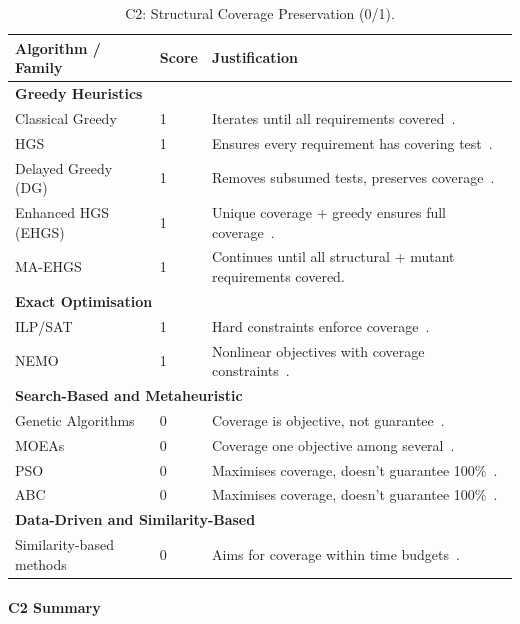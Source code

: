 \begin{appendices}
\begin{table}[H]
  \centering
  \footnotesize
  \caption{C2: Structural Coverage Preservation (0/1).}
  \label{tab:app-c2}
  \begin{tabular}{@{}p{4.5cm}p{0.8cm}p{6.9cm}@{}}
    \toprule
    \textbf{Algorithm / Family} & \textbf{Score} & \textbf{Justification} \\
    \midrule
    \multicolumn{3}{l}{\textbf{Greedy Heuristics}} \\
    Classical Greedy & 1 & Iterates until all requirements covered~\cite{chvatal1979,yoo2012}. \\
    HGS & 1 & Ensures every requirement has covering test~\cite{harrold1993}. \\
    Delayed Greedy (DG) & 1 & Removes subsumed tests, preserves coverage~\cite{tallam2005}. \\
    Enhanced HGS (EHGS) & 1 & Unique coverage + greedy ensures full coverage~\cite{gladston2015}. \\
    MA-EHGS & 1 & Continues until all structural + mutant requirements covered. \\[0.2em]
    \multicolumn{3}{l}{\textbf{Exact Optimisation}} \\
    ILP/SAT & 1 & Hard constraints enforce coverage~\cite{elbaum2002}. \\
    NEMO & 1 & Nonlinear objectives with coverage constraints~\cite{lin2018}. \\[0.2em]
    \multicolumn{3}{l}{\textbf{Search-Based and Metaheuristic}} \\
    Genetic Algorithms & 0 & Coverage is objective, not guarantee~\cite{yoo2012}. \\
    MOEAs & 0 & Coverage one objective among several~\cite{wei2017}. \\
    PSO & 0 & Maximises coverage, doesn't guarantee 100\%~\cite{ahuja2024}. \\
    ABC & 0 & Maximises coverage, doesn't guarantee 100\%~\cite{ahuja2024}. \\[0.2em]
    \multicolumn{3}{l}{\textbf{Data-Driven and Similarity-Based}} \\
    Similarity-based methods & 0 & Aims for coverage within time budgets~\cite{bach2017}. \\
    \bottomrule
  \end{tabular}
\end{table}

\paragraph*{C2 Summary}


\end{appendices}
